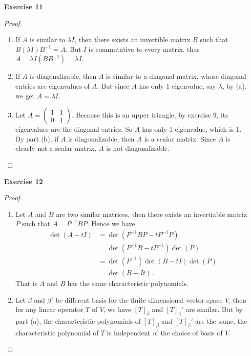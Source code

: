 \documentclass[12pt, a4paper]{article}
\theoremstyle{plain}
\newenvironment{exercise}[2][Exercise]
    { \begin{mdframed}[backgroundcolor=gray!20] \textbf{#1 #2} \\}
    {  \end{mdframed}}
\begin{document}
\begin{exercise}{11}

\end{exercise}
	\begin{proof}
	\hfill
	\begin{enumerate}[label=(\alph*)]
	\item If $A$ is similar to $\lambda I$, then there exists an invertible matrix $B$ such that $B(\lambda I)B^{-1}=A$. But $I$ is commutative to every matrix, thus $A=\lambda I(BB^{-1})=\lambda I$.
	
	\item If $A$ is diagonalizable, then $A$ is similar to a diagonal matrix, whose diagonal entries are eigenvalues of $A$. But since $A$ has only 1 eigenvalue, say $\lambda$, by (a), we get $A=\lambda I$.
	
	\item Let $A=\begin{pmatrix}
	1&1\\
	0&1
	\end{pmatrix}$. Because this is an upper triangle, by exercise 9, its eigenvalues are the diagonal entries. So $A$ has only 1 eigenvalue, which is $1$. By part (b), if $A$ is diagonalizable, then $A$ is a scalar matrix. Since $A$ is clearly not a scalar matrix, $A$ is not diagonalizable.
	\end{enumerate}
	\end{proof}
	
\begin{exercise}{12}

\end{exercise}
\begin{proof}
\hfill
\begin{enumerate}[label=(\alph*)]
\item Let $A$ and $B$ are two similar matrices, then there exists an invertiable matrix $P$ such that $A=P^{-1}BP$. Hence we have
\begin{align*}
    \det(A-tI)&=\det (P^{-1}BP-tP^{-1}P)\\
    &=\det(P^{-1}B-tP^{-1})\det(P)\\
    &=\det(P^{-1})\det(B-tI)\det(P)\\
    &=\det(B-It).
\end{align*}
That is $A$ and $B$ has the same characteristic polynomials.
\item Let $\beta$ and $\beta'$ be different basis for the finite dimensional vector space $V$, then for any linear operator $T$ of $V$, we have $[T]_\beta$ and $[T]_\beta'$ are similar. But by part (a), the characteristic polynomials of $[T]_\beta$ and $[T]_\beta'$ are the same, the characteristic polynomial of $T$ is independent of the choice of basis of $V$.
\end{enumerate}
\end{proof}
\end{document}

